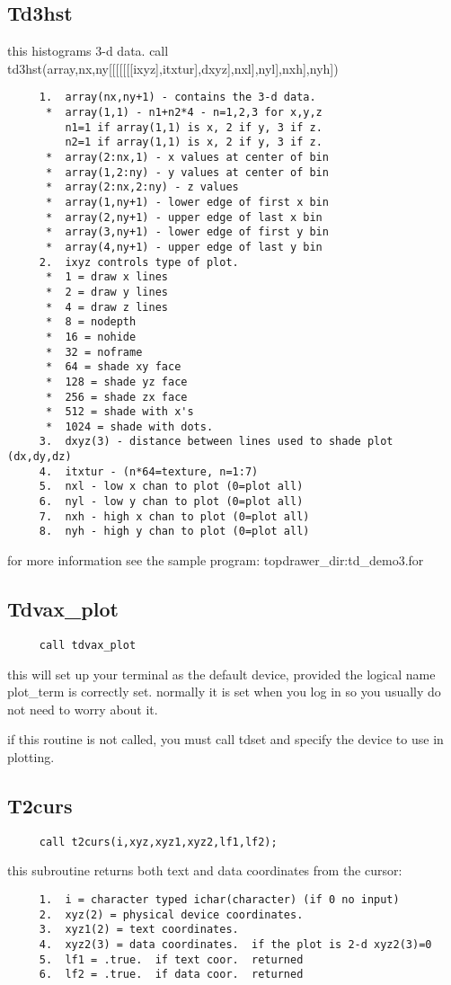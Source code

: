 \subsection{Td3hst}
this histograms 3-d data.  
call td3hst(array,nx,ny[[[[[[[ixyz],itxtur],dxyz],nxl],nyl],nxh],nyh]) 
\begin{verbatim}
     1.  array(nx,ny+1) - contains the 3-d data.  
      *  array(1,1) - n1+n2*4 - n=1,2,3 for x,y,z 
         n1=1 if array(1,1) is x, 2 if y, 3 if z.  
         n2=1 if array(1,1) is x, 2 if y, 3 if z.  
      *  array(2:nx,1) - x values at center of bin 
      *  array(1,2:ny) - y values at center of bin 
      *  array(2:nx,2:ny) - z values 
      *  array(1,ny+1) - lower edge of first x bin 
      *  array(2,ny+1) - upper edge of last x bin 
      *  array(3,ny+1) - lower edge of first y bin 
      *  array(4,ny+1) - upper edge of last y bin 
     2.  ixyz controls type of plot.  
      *  1 = draw x lines 
      *  2 = draw y lines 
      *  4 = draw z lines 
      *  8 = nodepth 
      *  16 = nohide 
      *  32 = noframe 
      *  64 = shade xy face 
      *  128 = shade yz face 
      *  256 = shade zx face 
      *  512 = shade with x's 
      *  1024 = shade with dots.  
     3.  dxyz(3) - distance between lines used to shade plot (dx,dy,dz) 
     4.  itxtur - (n*64=texture, n=1:7) 
     5.  nxl - low x chan to plot (0=plot all) 
     6.  nyl - low y chan to plot (0=plot all) 
     7.  nxh - high x chan to plot (0=plot all) 
     8.  nyh - high y chan to plot (0=plot all) 
\end{verbatim}
for more information see the sample program:  topdrawer\_dir:td\_demo3.for 
\subsection{Tdvax\_plot}
\begin{verbatim}
     call tdvax_plot 
\end{verbatim}
this  will  set  up  your  terminal  as  the default device, provided the
logical name plot\_term is correctly set.  normally it is set when you log
in so you usually do not need to worry about it.  

if this routine is not called, you must call tdset and specify the device
to use in plotting.  
\subsection{T2curs}
\begin{verbatim}
     call t2curs(i,xyz,xyz1,xyz2,lf1,lf2);  
\end{verbatim}
this subroutine returns both text and data coordinates from the cursor:  
\begin{verbatim}
     1.  i = character typed ichar(character) (if 0 no input) 
     2.  xyz(2) = physical device coordinates.  
     3.  xyz1(2) = text coordinates.  
     4.  xyz2(3) = data coordinates.  if the plot is 2-d xyz2(3)=0 
     5.  lf1 = .true.  if text coor.  returned 
     6.  lf2 = .true.  if data coor.  returned 
\end{verbatim}
